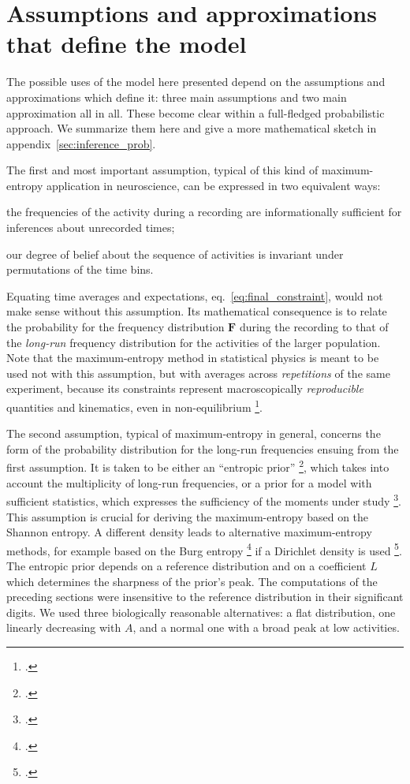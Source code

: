 \documentclass[\ifafour a4paper,12pt,\else a5paper,10pt,\fi%
onecolumn,oneside,article,%
british%
]{memoir}
\theoremstyle{remark}
\theoremstyle{innote}
\newcommand*{\citep}{\footcites}
\renewcommand*{\|}{\nonscript\,\vert\nonscript\;\mathopen{}}
\newcommand*{\eqn}{eq.}%
\newcommand*{\yAv}{A}
\newcommand*{\yFF}{F}
\newcommand*{\yF}{\bm{\yFF}}
\newcommand*{\yA}{\yAv}%
\begin{document}
\section{Assumptions and approximations that define the model}
\label{sec:assumptions}

The possible uses of the model here presented depend on the assumptions and
approximations which define it: three main assumptions and two main
approximation all in all. These become clear within a full-fledged
probabilistic approach. We summarize them here and give a more mathematical
sketch in appendix~\ref{sec:inference_prob}.

The first and most important assumption, typical of this kind of
maximum-entropy application in neuroscience, can be expressed in two
equivalent ways:
\begin{enumerate*}[(\roman*)]
\item the frequencies of the activity during a recording are
  informationally sufficient for inferences about unrecorded times; \item
  our degree of belief about the sequence of activities is invariant under
  permutations of the time bins.
\end{enumerate*}
Equating time averages and expectations, \eqn~\eqref{eq:final_constraint},
would not make sense without this assumption. Its mathematical consequence
is to relate the probability for the frequency distribution $\yF$ during
the recording to that of the \emph{long-run} frequency distribution for the
activities of the larger population. Note that the maximum-entropy method
in statistical physics is meant to be used not with this assumption, but
with averages across \emph{repetitions} of the same experiment, because its
constraints represent macroscopically \emph{reproducible} quantities and
kinematics, even in non-equilibrium
\citep{jaynes1957,guntonetal1983,tikochinskyetal1984,grandy1988,berryetal1988,deroecketal2005_r2006,touchette2009}.

The second assumption, typical of maximum-entropy in general, concerns the
form of the probability distribution for the long-run frequencies ensuing
from the first assumption. It is taken to be either an \enquote{entropic
  prior} \citep{skillingetal1984,rodriguez1991,neumann2007}, which takes
into account the multiplicity of long-run frequencies, or a prior for a
model with sufficient statistics, which expresses the sufficiency of the
moments under study \citep{portamana2017}. This assumption is crucial for
deriving the maximum-entropy based on the Shannon entropy. A different
density leads to alternative maximum-entropy methods, for example based on
the Burg entropy \citep{burg1975} if a Dirichlet density is used
\citep{jaynes1986d_r1996}. The entropic prior depends on a reference
distribution and on a coefficient $L$ which determines the sharpness of the
prior's peak. The computations of the preceding sections were insensitive
to the reference distribution in their significant digits. We used three
biologically reasonable alternatives: a flat distribution, one linearly
decreasing with $\yA$, and a normal one with a broad peak at low
activities.
\end{document}
